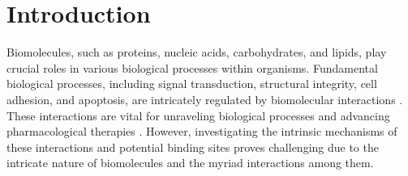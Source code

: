 \documentclass[Ingles]{phdthesis}
\begin{document}
\clearpage




\clearpage

\tableofcontents

\fimdaspaginasiniciais



\chapter{Introduction}

Biomolecules, such as proteins, nucleic acids, carbohydrates, and lipids, play crucial roles in various biological processes within organisms. Fundamental biological processes, including signal transduction, structural integrity, cell adhesion, and apoptosis, are intricately regulated by biomolecular interactions \cite{sotriffer2002,henrich2010,kozlikova2016}. These interactions are vital for unraveling biological processes and advancing pharmacological therapies \cite{henrich2010}. However, investigating the intrinsic mechanisms of these interactions and potential binding sites proves challenging due to the intricate nature of biomolecules and the myriad interactions among them.
\end{document}
